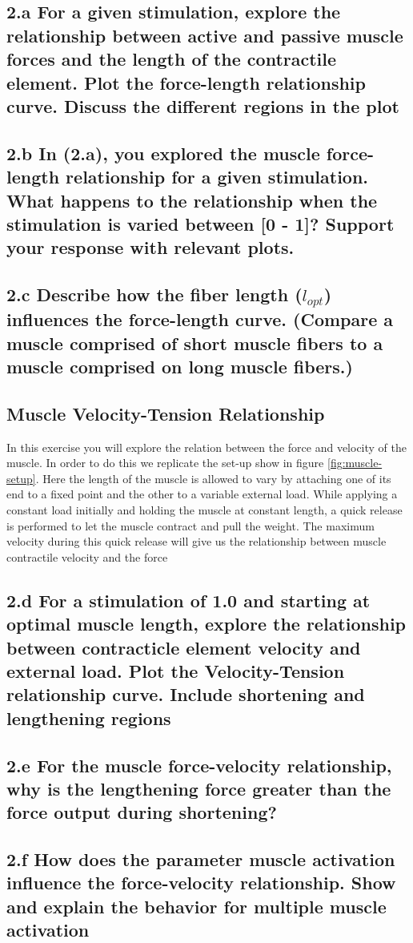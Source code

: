 \documentclass{cmc}
\begin{document}
\subsection*{2.a For a given stimulation, explore the relationship
  between active and passive muscle forces and the length of the
  contractile element.  Plot the force-length relationship curve.
  Discuss the different regions in the plot}

\subsection*{2.b In (2.a), you explored the muscle force-length
  relationship for a given stimulation. What happens to the
  relationship when the stimulation is varied between [0 - 1]? Support
  your response with relevant plots.}



\subsection*{2.c Describe how the fiber length ($l_{opt}$) influences
  the force-length curve.  (Compare a muscle comprised of short muscle
  fibers to a muscle comprised on long muscle fibers.)}

\subsection*{Muscle Velocity-Tension Relationship}
In this exercise you will explore the relation between the force and
velocity of the muscle. In order to do this we replicate the set-up
show in figure \ref{fig:muscle-setup}. Here the length of the muscle is
allowed to vary by attaching one of its end to a fixed point and the
other to a variable external load. While applying a constant load
initially and holding the muscle at constant length, a quick release
is performed to let the muscle contract and pull the weight. The
maximum velocity during this quick release will give us the
relationship between muscle contractile velocity and the force

\subsection*{2.d For a stimulation of 1.0 and starting at optimal
  muscle length, explore the relationship between contracticle element
  velocity and external load. Plot the Velocity-Tension relationship
  curve. Include shortening and lengthening regions}

\subsection*{2.e For the muscle force-velocity relationship, why is
  the lengthening force greater than the force output during
  shortening?}

\subsection*{2.f How does the parameter muscle activation influence the
  force-velocity relationship.  Show and explain the behavior for
  multiple muscle activation}
\end{document}
